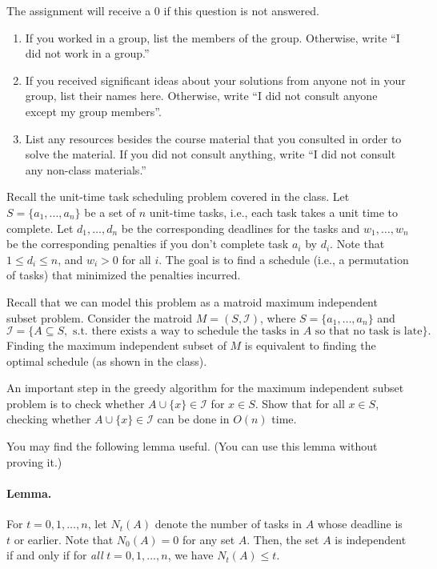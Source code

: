 \documentclass[11pt]{article}
\begin{document}
\begin{qunlist}
\setcounter{sparectr}{-1}

	The assignment will receive a 0 if this question is not answered.
\begin{enumerate}
	\item If you worked in a group, list the members of the group. Otherwise, write ``I did not work in a group.''
	\item If you received significant ideas about your solutions from anyone not in your group, list their names here. Otherwise, write ``I did not consult  anyone except my group members''.
	\item List any resources besides the course material that you consulted in order to solve the material. If you did not consult anything, write ``I did not consult any non-class materials.''
\end{enumerate}


Recall the unit-time task scheduling problem covered in the class. Let $S = \{a_1, \ldots, a_n\}$ be a set of $n$ unit-time tasks, i.e., each task takes a unit time to complete. Let $d_1, \ldots, d_n$ be the corresponding deadlines for the tasks and $w_1, \ldots, w_n$ be the corresponding penalties if you don't complete task $a_i$ by $d_i$. Note that $1\leq d_i \leq n$, and $w_i > 0$ for all $i$. The goal is to find a schedule (i.e., a permutation of tasks) that minimized the penalties incurred.

Recall that we can model this problem as a matroid maximum independent subset problem. Consider the matroid $M = (S, \mathcal{I})$, where $S = \{a_1, \ldots, a_n\}$ and $$\mathcal{I} = \{A\subseteq S, \text{ s.t.~there exists a way to schedule the tasks in } A \text{ so that no task is late}\}.$$  Finding the maximum independent subset of $M$ is equivalent to finding the optimal schedule (as shown in the class).

An important step in the greedy algorithm for the maximum independent subset problem is to check whether $A\cup \{x\} \in \mathcal{I}$ for $x \in S$. Show that for all $x \in S$, checking whether $A\cup \{x\} \in \mathcal{I}$ can be done in $O(n)$ time.

You may find the following lemma useful. (You can use this lemma without proving it.)
\vspace{-1em}
\paragraph{Lemma.} For $t = 0, 1, \ldots, n$, let $N_t(A)$ denote the number of tasks in $A$ whose deadline is $t$ or earlier. Note that $N_0(A) = 0$ for any set $A$. Then, the set $A$ is independent if and only if for \emph{all} $t = 0, 1, \ldots, n$, we have $N_t(A) \leq t$.


\end{qunlist}
\end{document}
